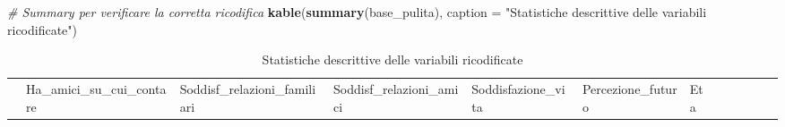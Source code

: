 \documentclass[
]{article}
\newenvironment{Shaded}{\begin{snugshade}}{\end{snugshade}}
\newcommand{\AttributeTok}[1]{\textcolor[rgb]{0.13,0.29,0.53}{#1}}
\newcommand{\CommentTok}[1]{\textcolor[rgb]{0.56,0.35,0.01}{\textit{#1}}}
\newcommand{\FunctionTok}[1]{\textcolor[rgb]{0.13,0.29,0.53}{\textbf{#1}}}
\newcommand{\NormalTok}[1]{#1}
\newcommand{\StringTok}[1]{\textcolor[rgb]{0.31,0.60,0.02}{#1}}
\begin{document}
\begin{Shaded}
\begin{Highlighting}[]
\CommentTok{\# Summary per verificare la corretta ricodifica}
\FunctionTok{kable}\NormalTok{(}\FunctionTok{summary}\NormalTok{(base\_pulita), }\AttributeTok{caption =} \StringTok{"Statistiche descrittive delle variabili ricodificate"}\NormalTok{)}
\end{Highlighting}
\end{Shaded}

\begin{longtable}[]{@{}
  >{\raggedright\arraybackslash}p{}
  >{\raggedright\arraybackslash}p{}
  >{\raggedright\arraybackslash}p{}
  >{\raggedright\arraybackslash}p{}
  >{\raggedright\arraybackslash}p{}
  >{\raggedright\arraybackslash}p{}
  >{\raggedright\arraybackslash}p{}
  >{\raggedright\arraybackslash}p{}
  >{\raggedright\arraybackslash}p{}
  >{\raggedright\arraybackslash}p{}
  >{\raggedright\arraybackslash}p{}
  >{\raggedright\arraybackslash}p{}@{}}
\caption{Statistiche descrittive delle variabili
ricodificate}\tabularnewline
\toprule\noalign{}
\begin{minipage}[b]{\linewidth}\raggedright
\end{minipage} & \begin{minipage}[b]{\linewidth}\raggedright
Ha\_amici\_su\_cui\_contare
\end{minipage} & \begin{minipage}[b]{\linewidth}\raggedright
Soddisf\_relazioni\_familiari
\end{minipage} & \begin{minipage}[b]{\linewidth}\raggedright
Soddisf\_relazioni\_amici
\end{minipage} & \begin{minipage}[b]{\linewidth}\raggedright
Soddisfazione\_vita
\end{minipage} & \begin{minipage}[b]{\linewidth}\raggedright
Percezione\_futuro
\end{minipage} & \begin{minipage}[b]{\linewidth}\raggedright
Eta
\end{minipage} & \begin{minipage}[b]{\linewidth}\raggedright

\end{minipage}
\end{longtable}
\end{document}
